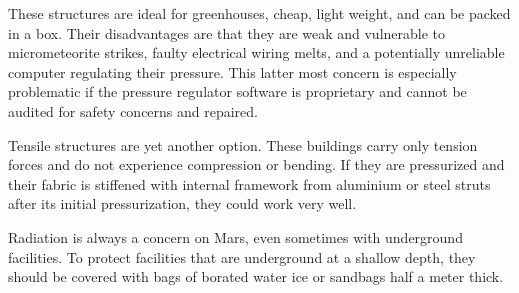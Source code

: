 These structures are ideal for greenhouses, cheap, light weight, and can be packed in a box. Their disadvantages are that they are weak and vulnerable to micrometeorite strikes, faulty electrical wiring melts, and a potentially unreliable computer regulating their pressure. This latter most concern is especially problematic if the pressure regulator software is proprietary and cannot be audited for safety concerns and repaired.

Tensile structures are yet another option. These buildings carry only tension forces and do not experience compression or bending. If they are pressurized and their fabric is stiffened with internal framework from aluminium or steel struts after its initial pressurization, they could work very well.

Radiation is always a concern on Mars, even sometimes with underground facilities. To protect facilities that are underground at a shallow depth, they should be covered with bags of borated water ice or sandbags half a meter thick.

